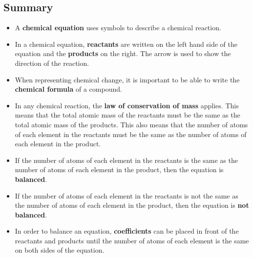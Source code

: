             \subsection{ Summary}
            \nopagebreak
      \label{m38727*id67171}\begin{itemize}[noitemsep]
            \label{m38727*uid36}\item A \textbf{chemical equation} uses symbols to describe a chemical reaction.
\label{m38727*uid37}\item In a chemical equation, \textbf{reactants} are written on the left hand side of the equation and the \textbf{products} on the right. The arrow is used to show the direction of the reaction.
\label{m38727*uid38}\item When representing chemical change, it is important to be able to write the \textbf{chemical formula} of a compound.
\label{m38727*uid39}\item In any chemical reaction, the \textbf{law of conservation of mass} applies. This means that the total atomic mass of the reactants must be the same as the total atomic mass of the products. This also means that the number of atoms of each element in the reactants must be the same as the number of atoms of each element in the product.
\label{m38727*uid40}\item If the number of atoms of each element in the reactants is the same as the number of atoms of each element in the product, then the equation is \textbf{balanced}.
\label{m38727*uid41}\item If the number of atoms of each element in the reactants is not the same as the number of atoms of each element in the product, then the equation is \textbf{not balanced}.
\label{m38727*uid42}\item In order to balance an equation, \textbf{coefficients} can be placed in front of the reactants and products until the number of atoms of each element is the same on both sides of the equation.
\end{itemize}
\label{m38727*secfhsst!!!underscore!!!id1434}
